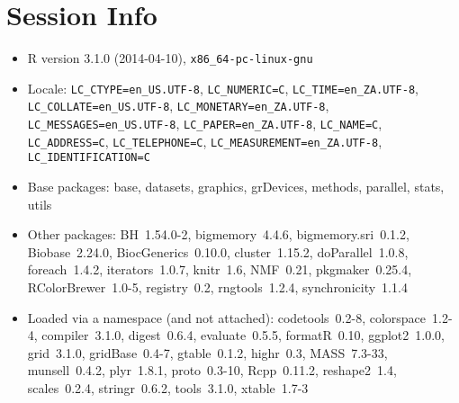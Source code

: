 \documentclass[a4paper]{article}\usepackage[]{graphicx}\usepackage[]{color}
\begin{document}
\section{Session Info}
\begin{itemize}\raggedright
  \item R version 3.1.0 (2014-04-10), \verb|x86_64-pc-linux-gnu|
  \item Locale: \verb|LC_CTYPE=en_US.UTF-8|, \verb|LC_NUMERIC=C|, \verb|LC_TIME=en_ZA.UTF-8|, \verb|LC_COLLATE=en_US.UTF-8|, \verb|LC_MONETARY=en_ZA.UTF-8|, \verb|LC_MESSAGES=en_US.UTF-8|, \verb|LC_PAPER=en_ZA.UTF-8|, \verb|LC_NAME=C|, \verb|LC_ADDRESS=C|, \verb|LC_TELEPHONE=C|, \verb|LC_MEASUREMENT=en_ZA.UTF-8|, \verb|LC_IDENTIFICATION=C|
  \item Base packages: base, datasets, graphics, grDevices,
    methods, parallel, stats, utils
  \item Other packages: BH~1.54.0-2, bigmemory~4.4.6,
    bigmemory.sri~0.1.2, Biobase~2.24.0, BiocGenerics~0.10.0,
    cluster~1.15.2, doParallel~1.0.8, foreach~1.4.2,
    iterators~1.0.7, knitr~1.6, NMF~0.21, pkgmaker~0.25.4,
    RColorBrewer~1.0-5, registry~0.2, rngtools~1.2.4,
    synchronicity~1.1.4
  \item Loaded via a namespace (and not attached):
    codetools~0.2-8, colorspace~1.2-4, compiler~3.1.0,
    digest~0.6.4, evaluate~0.5.5, formatR~0.10, ggplot2~1.0.0,
    grid~3.1.0, gridBase~0.4-7, gtable~0.1.2, highr~0.3,
    MASS~7.3-33, munsell~0.4.2, plyr~1.8.1, proto~0.3-10,
    Rcpp~0.11.2, reshape2~1.4, scales~0.2.4, stringr~0.6.2,
    tools~3.1.0, xtable~1.7-3
\end{itemize}


\printbibliography[heading=bibintoc]
\end{document}
